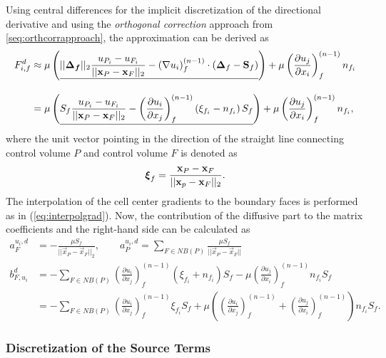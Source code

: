 Using central differences for the implicit discretization of the directional derivative and using the \emph{orthogonal correction} approach from \ref{seq:orthcorrapproach}, the approximation can be derived as
\begin{align*}
  F_{i,f}^d 
  &\approx 
  \mu \left( \underline{||\boldsymbol{\boldsymbol{\Delta}_f}||_2 \frac{u_{P_i} - u_{F_i}}{ || \mathbf{x}_P - \mathbf{x}_F ||_2 }  
  -  \left(\nabla u_i \right)_f^{(n-1)} \cdot \left(\boldsymbol{\Delta}_f - \mathbf{S}_f\right)  }  \right)
  + \mu \left( \frac{\partial u_j}{\partial x_i} \right)_f^{(n-1)} n_{f_i} \\[1em]
  &= \mu \left(\underline{  S_f \frac{u_{P_i} - u_{F_i}}{ || \mathbf{x}_P - \mathbf{x}_F ||_2 }  
  - \left( \frac{\partial u_i}{\partial x_j}\right)_f^{(n-1)} \left(\xi_{f_i} - n_{f_i}\right)S_f  } \right)
  + \mu \left( \frac{\partial u_j}{\partial x_i} \right)_f^{(n-1)} n_{f_i},
\end{align*}
where the unit vector pointing in the direction of the straight line connecting control volume \(P\) and control volume \(F\) is denoted as
\begin{displaymath}
  \boldsymbol{\xi}_f = \frac{\mathbf{x}_P - \mathbf{x}_F}{|| \mathbf{x}_p - \mathbf{x}_F ||_2}.
\end{displaymath}
The interpolation of the cell center gradients to the boundary faces is performed as in (\ref{eq:interpolgrad}). Now, the contribution of the diffusive part to the matrix coefficients and the right-hand side can be calculated as
\begin{align*}
  a_F^{u_i,d} &= - \frac{\mu S_f}{||\vec{x}_P - \vec{x}_F||_2}, 
  \quad \quad a_P^{u_i,d} = \sum_{F \in NB(P)} \frac{\mu S_f}{|| \vec{x}_P - \vec{x}_F ||} \\[1em]
  b_{F,u_i}^d &=  - \sum_{F \in NB(P)} \left( \frac{\partial u_i}{\partial x_j}\right)_f^{(n-1)} \left(\xi_{f_i} + n_{f_i}\right)S_f  
  - \mu \left( \frac{\partial u_j}{\partial x_i} \right)_f^{(n-1)} n_{f_i} S_f   \nonumber \\[0.5em]
  &=  - \sum_{F \in NB(P)} \left( \frac{\partial u_i}{\partial x_j}\right)_f^{(n-1)} \xi_{f_i} S_f
  + \mu \left( \left( \frac{\partial u_i}{\partial x_j} \right)_f^{(n-1)}
  + \left( \frac{\partial u_j}{\partial x_i} \right)_f^{(n-1)} \right) n_{f_i} S_f.
\end{align*}

\subsubsection{Discretization of the Source Terms}

